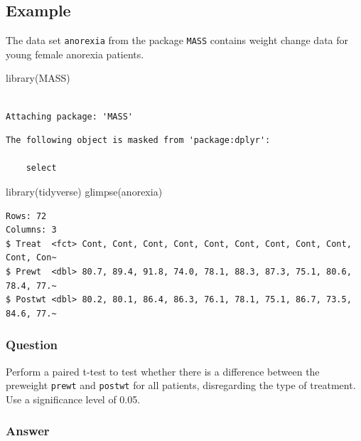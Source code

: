 \documentclass[
  letterpaper,
  DIV=11,
  numbers=noendperiod]{scrartcl}
\newenvironment{Shaded}{\begin{snugshade}}{\end{snugshade}}
\newcommand{\FunctionTok}[1]{\textcolor[rgb]{0.28,0.35,0.67}{#1}}
\newcommand{\NormalTok}[1]{\textcolor[rgb]{0.00,0.23,0.31}{#1}}
\begin{document}
\subsection{Example}\label{example-6}

The data set \texttt{anorexia} from the package \texttt{MASS} contains
weight change data for young female anorexia patients.

\begin{Shaded}
\begin{Highlighting}[]
\FunctionTok{library}\NormalTok{(MASS)}
\end{Highlighting}
\end{Shaded}

\begin{verbatim}

Attaching package: 'MASS'
\end{verbatim}

\begin{verbatim}
The following object is masked from 'package:dplyr':

    select
\end{verbatim}

\begin{Shaded}
\begin{Highlighting}[]
\FunctionTok{library}\NormalTok{(tidyverse)}
\FunctionTok{glimpse}\NormalTok{(anorexia)}
\end{Highlighting}
\end{Shaded}

\begin{verbatim}
Rows: 72
Columns: 3
$ Treat  <fct> Cont, Cont, Cont, Cont, Cont, Cont, Cont, Cont, Cont, Cont, Con~
$ Prewt  <dbl> 80.7, 89.4, 91.8, 74.0, 78.1, 88.3, 87.3, 75.1, 80.6, 78.4, 77.~
$ Postwt <dbl> 80.2, 80.1, 86.4, 86.3, 76.1, 78.1, 75.1, 86.7, 73.5, 84.6, 77.~
\end{verbatim}

\subsubsection{Question}

Perform a paired t-test to test whether there is a difference between
the preweight \texttt{prewt} and \texttt{postwt} for all patients,
disregarding the type of treatment. Use a significance level of 0.05.

\subsubsection{Answer}
\end{document}
